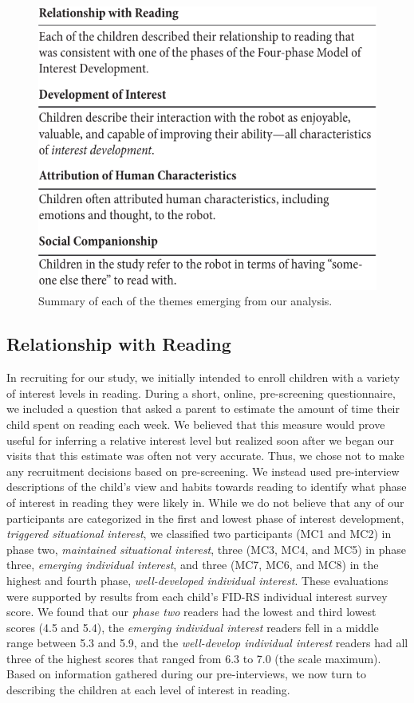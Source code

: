 \documentclass{sigchi}
\begin{document}
\begin{figure}[t]
	\centering
	\includegraphics[width=1\columnwidth]{figures/chi17-michaelis-figures-summary.pdf}
	\caption{Summary of each of the themes emerging from our analysis.}
	\label{fig:figure4}
\end{figure}

\subsection{Relationship with Reading}
In recruiting for our study, we initially intended to enroll children with a variety of interest levels in reading. During a short, online, pre-screening questionnaire, we included a question that asked a parent to estimate the amount of time their child spent on reading each week. We believed that this measure would prove useful for inferring a relative interest level but realized soon after we began our visits that this estimate was often not very accurate. Thus, we chose not to make any recruitment decisions based on pre-screening. We instead used pre-interview descriptions of the child's view and habits towards reading to identify what phase of interest in reading they were likely in. While we do not believe that any of our participants are categorized in the first and lowest phase of interest development, \textit{triggered situational interest}, we classified two participants (MC1 and MC2) in phase two, \textit{maintained situational interest}, three (MC3, MC4, and MC5) in phase three, \textit{emerging individual interest}, and three (MC7, MC6, and MC8) in the highest and fourth phase, \textit{well-developed individual interest}. These evaluations were supported by results from each child's FID-RS individual interest survey score. We found that our \textit{phase two} readers had the lowest and third lowest scores (4.5 and 5.4), the \textit{emerging individual interest} readers fell in a middle range between 5.3 and 5.9, and the \textit{well-develop individual interest} readers had all three of the highest scores that ranged from 6.3 to 7.0 (the scale maximum). Based on information gathered during our pre-interviews, we now turn to describing the children at each level of interest in reading. 
\end{document}
